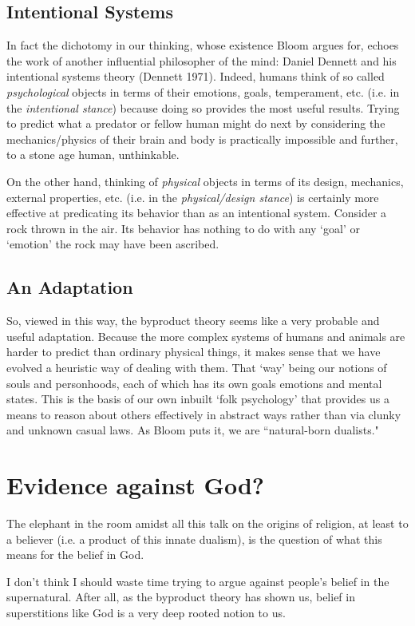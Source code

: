 \documentclass{article}
\begin{document}
\subsection{Intentional Systems}
In fact the dichotomy in our thinking, whose existence Bloom argues for, echoes the work of another influential philosopher of the mind: Daniel Dennett and his intentional systems theory (Dennett 1971). Indeed, humans think of so called \emph{psychological} objects in terms of their emotions, goals, temperament, etc. (i.e. in the \emph{intentional stance}) because doing so provides the most useful results. Trying to predict what a predator or fellow human might do next by considering the mechanics/physics of their brain and body is practically impossible and further, to a stone age human, unthinkable.

On the other hand, thinking of \emph{physical} objects in terms of its design, mechanics, external properties, etc. (i.e. in the \emph{physical/design stance}) is certainly more effective at predicating its behavior than as an intentional system. Consider a rock thrown in the air. Its behavior has nothing to do with any `goal' or `emotion' the rock may have been ascribed.

\subsection{An Adaptation}
So, viewed in this way, the byproduct theory seems like a very probable and useful adaptation. Because the more complex systems of humans and animals are harder to predict than ordinary physical things, it makes sense that we have evolved a heuristic way of dealing with them. That `way' being our notions of souls and personhoods, each of which has its own goals emotions and mental states. This is the basis of our own inbuilt `folk psychology' that provides  us a means to reason about others effectively in abstract ways rather than via clunky and unknown casual laws. As Bloom puts it, we are ``natural-born dualists."

\section{Evidence against God?}
The elephant in the room amidst all this talk on the origins of religion, at least to a believer (i.e. a product of this innate dualism), is the question of what this means for the belief in God.

I don't think I should waste time trying to argue against people's belief in the supernatural. After all, as the byproduct theory has shown us, belief in superstitions like God is a very deep rooted notion to us.
\end{document}
